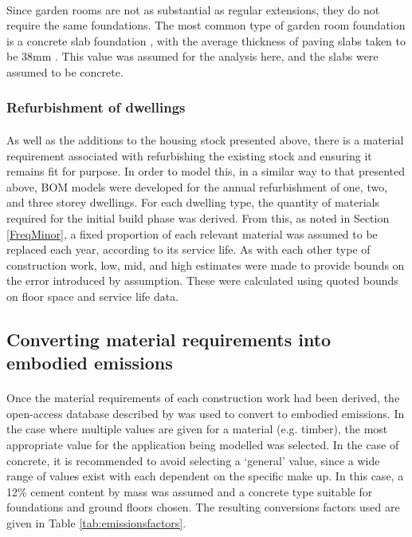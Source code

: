 \documentclass[12pt]{article}
\begin{document}
\paragraph{}
Since garden rooms are not as substantial as regular extensions, they do not require the same foundations. The most common type of garden room foundation is a concrete slab foundation \citep{Garden_room_guide_2009-hx}, with the average thickness of paving slabs taken to be 38mm \citep{Wickes_undated-br}. This value was assumed for the analysis here, and the slabs were assumed to be concrete.

\subsubsection{Refurbishment of dwellings}
\label{refurb}

\paragraph{}
As well as the additions to the housing stock presented above, there is a material requirement associated with refurbishing the existing stock and ensuring it remains fit for purpose. In order to model this, in a similar way to that presented above, BOM models were developed for the annual refurbishment of one, two, and three storey dwellings. For each dwelling type, the quantity of materials required for the initial build phase was derived. From this, as noted in Section \ref{FreqMinor}, a fixed proportion of each relevant material was assumed to be replaced each year, according to its service life. As with each other type of construction work, low, mid, and high estimates were made to provide bounds on the error introduced by assumption. These were calculated using quoted bounds on floor space and service life data.

\subsection{Converting material requirements into embodied emissions}
\label{materialtoemissions}

\paragraph{}
Once the material requirements of each construction work had been derived, the open-access database described by \citet{Hammond2008-np} was used to convert to embodied emissions. In the case where multiple values are given for a material (e.g. timber), the most appropriate value for the application being modelled was selected. In the case of concrete, it is recommended to avoid selecting a `general’ value, since a wide range of values exist with each dependent on the specific make up. In this case, a 12\% cement content by mass was assumed and a concrete type suitable for foundations and ground floors chosen. The resulting conversions factors used are given in Table \ref{tab:emissionsfactors}.
\end{document}
